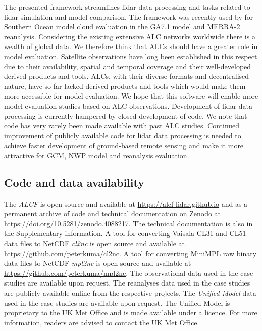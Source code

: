 The presented framework streamlines lidar data processing and tasks related
to lidar simulation and model comparison. The framework was
recently used by \cite{kuma2020a} for Southern Ocean model cloud evaluation
in the GA7.1 model and MERRA-2 reanalysis. Considering the existing extensive
ALC networks worldwide there is a wealth of global data. We therefore think that ALCs should have a greater role
in model evaluation. Satellite observations have long been established in this
respect due to their availability, spatial and temporal coverage and
their well-developed derived products and tools. ALCs, with their diverse
formats and decentralised nature, have so far lacked derived products and
tools which would make them more accessible for model evaluation. We hope that
this software will enable more model evaluation studies based on ALC
observations. Development of lidar data processing is currently hampered by
closed development of code. We note that code has very rarely been made
available with past ALC studies. Continued improvement of publicly available
code for lidar data processing is needed to achieve faster development of
ground-based remote sensing and make it more attractive for GCM, NWP model and
reanalysis evaluation.

\clearpage

\fontsize{10pt}{12pt}
\sffamily

\subsection*{Code and data availability}

The \textit{ALCF} is open source
and available at \url{https://alcf-lidar.github.io} and as a permanent archive
of code and technical documentation on Zenodo at
\url{https://doi.org/10.5281/zenodo.4088217}. The technical documentation
is also in the Supplementary information.
A tool for converting
Vaisala CL31 and CL51 data files to NetCDF \textit{cl2nc} is open source and available at
\url{https://github.com/peterkuma/cl2nc}. A tool for converting MiniMPL raw binary data
files to NetCDF \textit{mpl2nc} is open source and available at
\url{https://github.com/peterkuma/mpl2nc}. The observational
data used in the case studies are available upon request.
The reanalyses data used in the case studies are publicly available online
from the respective projects. The \textit{Unified Model} data used in the case studies
are available upon request. The Unified Model is proprietary to the UK Met Office
and is made available under a licence. For more information, readers are advised
to contact the UK Met Office.

